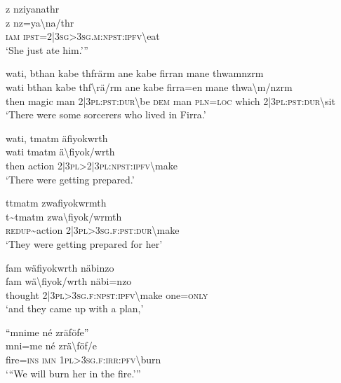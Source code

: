 \ea\label{ex:7:a4793}
z nziyanathr\\
\gll z	nz=ya{\textbackslash}na/thr\\
     \textsc{iam}	\textsc{ipst}=2|3\textsc{sg}>3\textsc{sg}.\textsc{m}:\textsc{npst}:\textsc{ipfv}{\textbackslash}eat\\
\glt `She just ate him.'''
\z

\ea\label{ex:7:a4794}
wati, bthan kabe thfrärm ane kabe firran mane thwamnzrm\\
\gll wati	bthan	kabe	thf{\textbackslash}rä/rm	ane	kabe	firra=en	mane	thwa{\textbackslash}m/nzrm\\
     then	magic	man	2|3\textsc{pl}:\textsc{pst}:\textsc{dur}{\textbackslash}be	\textsc{dem}	man	\textsc{pln}=\textsc{loc}	which	2|3\textsc{pl}:\textsc{pst}:\textsc{dur}{\textbackslash}sit\\
\glt `There were some sorcerers who lived in Firra.'
\z

\ea\label{ex:7:a4796}
wati, tmatm äfiyokwrth\\
\gll wati	tmatm	ä{\textbackslash}fiyok/wrth\\
     then	action	2|3\textsc{pl}>2|3\textsc{pl}:\textsc{npst}:\textsc{ipfv}{\textbackslash}make\\
\glt `There were getting prepared.'
\z

\ea\label{ex:7:a4797}
ttmatm zwafiyokwrmth\\
\gll t{\textasciitilde}tmatm	zwa{\textbackslash}fiyok/wrmth\\
     \textsc{redup}{\textasciitilde}action	2|3\textsc{pl}>3\textsc{sg}.\textsc{f}:\textsc{pst}:\textsc{dur}{\textbackslash}make\\
\glt `They were getting prepared for her'
\z

\newpage
\ea\label{ex:7:a4798}
fam wäfiyokwrth näbinzo\\
\gll fam	wä{\textbackslash}fiyok/wrth	näbi=nzo\\
     thought	2|3\textsc{pl}>3\textsc{sg}.\textsc{f}:\textsc{npst}:\textsc{ipfv}{\textbackslash}make	one=\textsc{only}\\
\glt `and they came up with a plan,'
\z

\ea\label{ex:7:a4799}
``mnime né zräföfe''\\
\gll mni=me	né	zrä{\textbackslash}föf/e\\
     fire=\textsc{ins}	\textsc{imn}	1\textsc{pl}>3\textsc{sg}.\textsc{f}:\textsc{irr}:\textsc{pfv}{\textbackslash}burn\\
\glt `{``}We will burn her in the fire.'''
\z

